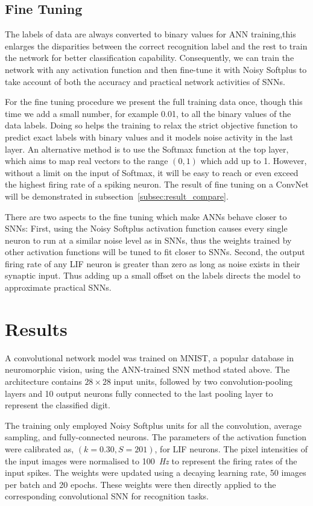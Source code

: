 \documentclass{article}
\begin{document}
\subsection{Fine Tuning}
The labels of data are always converted to binary values for ANN training,this enlarges the disparities between the correct recognition label and the rest to train the network for better classification capability.
Consequently, we can train the network with any activation function and then fine-tune it with Noisy Softplus to take account of both the accuracy and practical network activities of SNNs.



For the fine tuning procedure we present the full training data once, though this time we add a small number, for example 0.01, to all the binary values of the data labels.
Doing so helps the training to relax the strict objective function to predict exact labels with binary values and it models noise activity in the last layer.
An alternative method is to use the Softmax function at the top layer, which aims to map real vectors to the range $(0,1)$ which add up to 1. 
However, without a limit on the input of Softmax, it will be easy to reach or even exceed the highest firing rate of a spiking neuron.
The result of fine tuning on a ConvNet will be demonstrated in subsection~\ref{subsec:result_compare}.

There are two aspects to the fine tuning which make ANNs behave closer to SNNs:
First, using the Noisy Softplus activation function causes every single neuron to run at a similar noise level as in SNNs, thus the weights trained by other activation functions will be tuned to fit closer to SNNs.
Second, the output firing rate of any LIF neuron is greater than zero as long as noise exists in their synaptic input. Thus adding up a small offset on the labels directs the model to approximate practical SNNs. 

\section{Results}
\label{sec:result}
A convolutional network model was trained on MNIST,
a popular database in neuromorphic vision, using the ANN-trained SNN method stated above.
The architecture contains $28\times28$ input units, followed by two convolution-pooling layers and 10 output neurons fully connected to the last pooling layer to represent the classified digit.

The training only employed Noisy Softplus units for all the convolution, average sampling, and fully-connected neurons. %
The parameters of the activation function were calibrated as, $(k=0.30, S=201)$,  for LIF neurons.
The pixel intensities of the input images were normalised to 100~\textit{Hz} to represent the firing rates of the input spikes.
The weights were updated using a decaying learning rate, 50 images per batch and 20 epochs. These weights were then directly applied to the corresponding convolutional SNN  for recognition tasks.
\end{document}
